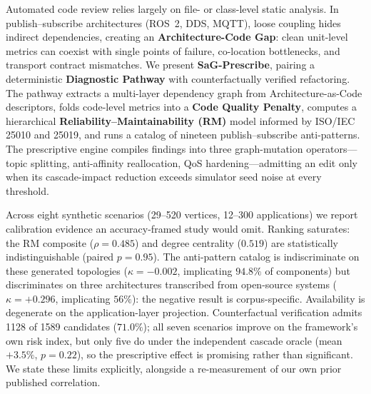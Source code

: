 Automated code review relies largely on file- or class-level static analysis. In publish--subscribe architectures (ROS~2, DDS, MQTT), loose coupling hides indirect dependencies, creating an \textbf{Architecture-Code Gap}: clean unit-level metrics can coexist with single points of failure, co-location bottlenecks, and transport contract mismatches. We present \textbf{SaG-Prescribe}, pairing a deterministic \textbf{Diagnostic Pathway} with counterfactually verified refactoring. The pathway extracts a multi-layer dependency graph from Architecture-as-Code descriptors, folds code-level metrics into a \textbf{Code Quality Penalty}, computes a hierarchical \textbf{Reliability--Maintainability (RM)} model informed by ISO/IEC 25010 and 25019, and runs a catalog of nineteen publish--subscribe anti-patterns. The prescriptive engine compiles findings into three graph-mutation operators---topic splitting, anti-affinity reallocation, QoS hardening---admitting an edit only when its cascade-impact reduction exceeds simulator seed noise at every threshold.

Across eight synthetic scenarios (29--520 vertices, 12--300 applications) we report calibration evidence an accuracy-framed study would omit. Ranking saturates: the RM composite ($\rho = 0.485$) and degree centrality ($0.519$) are statistically indistinguishable (paired $p = 0.95$). The anti-pattern catalog is indiscriminate on these generated topologies ($\kappa = -0.002$, implicating $94.8\%$ of components) but discriminates on three architectures transcribed from open-source systems ($\kappa = +0.296$, implicating $56\%$): the negative result is corpus-specific. Availability is degenerate on the application-layer projection. Counterfactual verification admits 1128 of 1589 candidates ($71.0\%$); all seven scenarios improve on the framework's own risk index, but only five do under the independent cascade oracle (mean $+3.5\%$, $p = 0.22$), so the prescriptive effect is promising rather than significant. We state these limits explicitly, alongside a re-measurement of our own prior published correlation.

